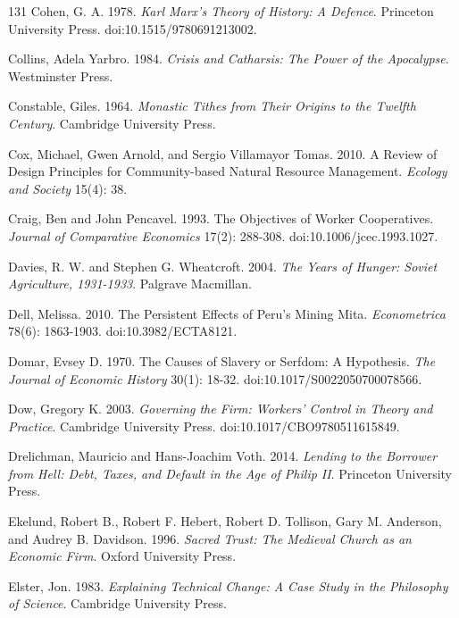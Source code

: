 \documentclass[11pt,letterpaper]{article}
\theoremstyle{definition}
\theoremstyle{remark}
\begin{document}
\begin{thebibliography}{131}
Cohen, G. A. 1978. \emph{Karl Marx's Theory of History: A Defence}. Princeton University Press. doi:10.1515/9780691213002.

Collins, Adela Yarbro. 1984. \emph{Crisis and Catharsis: The Power of the Apocalypse}. Westminster Press.

Constable, Giles. 1964. \emph{Monastic Tithes from Their Origins to the Twelfth Century}. Cambridge University Press.

Cox, Michael, Gwen Arnold, and Sergio Villamayor Tomas. 2010. A Review of Design Principles for Community-based Natural Resource Management. \emph{Ecology and Society} 15(4): 38.

Craig, Ben and John Pencavel. 1993. The Objectives of Worker Cooperatives. \emph{Journal of Comparative Economics} 17(2): 288-308. doi:10.1006/jcec.1993.1027.

Davies, R. W. and Stephen G. Wheatcroft. 2004. \emph{The Years of Hunger: Soviet Agriculture, 1931-1933}. Palgrave Macmillan.

Dell, Melissa. 2010. The Persistent Effects of Peru's Mining Mita. \emph{Econometrica} 78(6): 1863-1903. doi:10.3982/ECTA8121.

Domar, Evsey D. 1970. The Causes of Slavery or Serfdom: A Hypothesis. \emph{The Journal of Economic History} 30(1): 18-32. doi:10.1017/S0022050700078566.

Dow, Gregory K. 2003. \emph{Governing the Firm: Workers' Control in Theory and Practice}. Cambridge University Press. doi:10.1017/CBO9780511615849.

Drelichman, Mauricio and Hans-Joachim Voth. 2014. \emph{Lending to the Borrower from Hell: Debt, Taxes, and Default in the Age of Philip II}. Princeton University Press.

Ekelund, Robert B., Robert F. Hebert, Robert D. Tollison, Gary M. Anderson, and Audrey B. Davidson. 1996. \emph{Sacred Trust: The Medieval Church as an Economic Firm}. Oxford University Press.

Elster, Jon. 1983. \emph{Explaining Technical Change: A Case Study in the Philosophy of Science}. Cambridge University Press.


\end{thebibliography}
\end{document}
